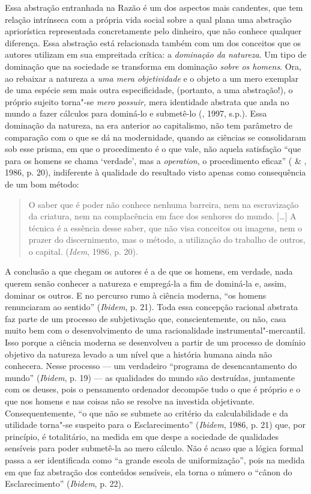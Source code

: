 Essa abstração entranhada na Razão é um dos aspectos mais candentes, que
tem relação intrínseca com a própria vida social sobre a qual plana uma
abstração apriorística representada concretamente pelo dinheiro, que não
conhece qualquer diferença. Essa abstração está relacionada também com
um dos conceitos que os autores utilizam em sua empreitada crítica: a
\emph{dominação da natureza}. Um tipo de dominação que na sociedade se
transforma em dominação \emph{sobre os homens}. Ora, ao rebaixar a
natureza a \emph{uma mera objetividade} e o objeto a um mero exemplar de
uma espécie sem mais outra especificidade, (portanto, a uma abstração!),
o próprio sujeito torna"-se \emph{mero possuir,} mera identidade abstrata
que anda no mundo a fazer cálculos para dominá-lo e submetê-lo (,
1997, s.p.). Essa dominação da natureza, na era anterior ao capitalismo,
não tem parâmetro de comparação com o que se dá na modernidade, quando
as ciências se consolidaram sob esse prisma, em que o procedimento é o
que vale, não aquela satisfação ``que para os homens se chama `verdade',
mas a \emph{operation}, o procedimento eficaz'' ( \& ,
1986, p. 20), indiferente à qualidade do resultado visto apenas como
consequência de um bom método:

\begin{quote}
O saber que é poder não conhece nenhuma barreira, nem na escravização da
criatura, nem na complacência em face dos senhores do mundo. [\ldots{}] A
técnica é a essência desse saber, que não visa conceitos ou imagens, nem
o prazer do discernimento, mas o método, a utilização do trabalho de
outros, o capital. (\emph{Idem}, 1986, p. 20).
\end{quote}

A conclusão a que chegam os autores é a de que os homens, em verdade,
nada querem senão conhecer a natureza e empregá-la a fim de dominá-la e,
assim, dominar os outros. E no percurso rumo à ciência moderna, ``os
homens renunciaram ao sentido'' (\emph{Ibidem}, p. 21). Toda essa
concepção racional abstrata faz parte de um processo de subjetivação
que, conscientemente, ou não, casa muito bem com o desenvolvimento de
uma racionalidade instrumental"-mercantil. Isso porque a ciência moderna
se desenvolveu a partir de um processo de domínio objetivo da natureza
levado a um nível que a história humana ainda não conhecera. Nesse
processo --- um verdadeiro ``programa de desencantamento do mundo''
(\emph{Ibidem}, p. 19) --- as qualidades do mundo são destruídas,
juntamente com os deuses, pois o pensamento ordenador decompõe tudo o
que é próprio e o que nos homens e nas coisas não se resolve na
investida objetivante. Consequentemente, ``o que não se submete ao
critério da calculabilidade e da utilidade torna"-se suspeito para o
Esclarecimento'' (\emph{Ibidem}, 1986, p. 21) que, por princípio, é
totalitário, na medida em que despe a sociedade de qualidades sensíveis
para poder submetê-la ao mero cálculo. Não é acaso que a lógica formal
passa a ser identificada como ``a grande escola de uniformização'', pois
na medida em que faz abstração dos conteúdos sensíveis, ela torna o
número o ``cânon do Esclarecimento'' (\emph{Ibidem}, p. 22).

